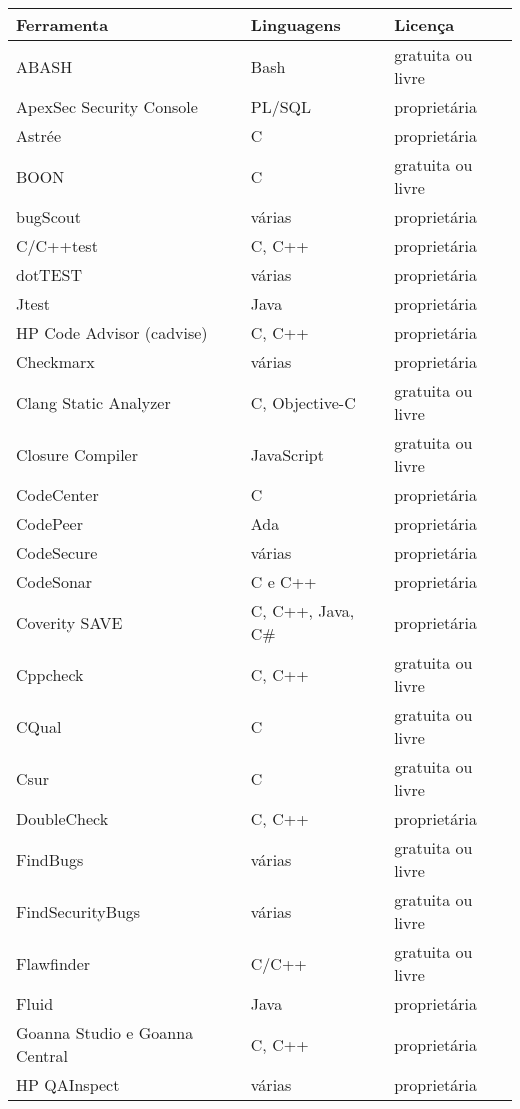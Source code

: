 \begin{center}
\begin{longtable}{ | l | l | l |}
\hline
Ferramenta &   Linguagens  & Licença \\ \hline
ABASH &   Bash  & gratuita ou livre \\ \hline
ApexSec Security Console &  PL/SQL   & proprietária \\ \hline
Astrée &  C   & proprietária \\ \hline
BOON &  C & gratuita ou livre \\ \hline
bugScout &  várias  & proprietária \\ \hline
C/C++test & C, C++  & proprietária \\ \hline
dotTEST &  várias & proprietária \\ \hline
Jtest & Java & proprietária \\ \hline
HP Code Advisor (cadvise) &   C, C++  & proprietária \\ \hline
Checkmarx & várias & proprietária \\ \hline
Clang Static Analyzer &  C, Objective-C  & gratuita ou livre \\ \hline
Closure Compiler &  JavaScript  & gratuita ou livre \\ \hline
CodeCenter &  C   & proprietária \\ \hline
CodePeer &  Ada   & proprietária \\ \hline
CodeSecure &  várias  & proprietária \\ \hline
CodeSonar &   C e C++   & proprietária \\ \hline
Coverity SAVE &  C, C++, Java, C\#  & proprietária \\ \hline
Cppcheck &  C, C++  & gratuita ou livre \\ \hline
CQual &   C   & gratuita ou livre \\ \hline
Csur &  C   & gratuita ou livre \\ \hline
DoubleCheck &   C, C++  & proprietária \\ \hline
FindBugs &  várias  & gratuita ou livre \\ \hline
FindSecurityBugs &  várias   & gratuita ou livre \\ \hline
Flawfinder &  C/C++   & gratuita ou livre \\ \hline
Fluid &   Java & proprietária \\ \hline
Goanna Studio e Goanna Central &  C, C++  & proprietária \\ \hline
HP QAInspect &  várias   & proprietária \\ \hline

\end{longtable}
\end{center}
